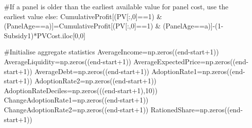 \documentclass[
  letterpaper,
  DIV=11,
  numbers=noendperiod]{scrartcl}
\newenvironment{Shaded}{\begin{snugshade}}{\end{snugshade}}
\newcommand{\CommentTok}[1]{\textcolor[rgb]{0.37,0.37,0.37}{#1}}
\newcommand{\ControlFlowTok}[1]{\textcolor[rgb]{0.00,0.23,0.31}{#1}}
\newcommand{\DecValTok}[1]{\textcolor[rgb]{0.68,0.00,0.00}{#1}}
\newcommand{\NormalTok}[1]{\textcolor[rgb]{0.00,0.23,0.31}{#1}}
\newcommand{\OperatorTok}[1]{\textcolor[rgb]{0.37,0.37,0.37}{#1}}
\begin{document}
\begin{Shaded}
\begin{Highlighting}[]
        \CommentTok{\#If a panel is older than the earliest available value for panel cost, use the earliest value}
        \ControlFlowTok{else}\NormalTok{:}
\NormalTok{            CumulativeProfit[(PV[:,}\DecValTok{0}\NormalTok{]}\OperatorTok{==}\DecValTok{1}\NormalTok{) }\OperatorTok{\&}\NormalTok{ (PanelAge}\OperatorTok{==}\NormalTok{a)]}\OperatorTok{=}\NormalTok{CumulativeProfit[(PV[:,}\DecValTok{0}\NormalTok{]}\OperatorTok{==}\DecValTok{1}\NormalTok{) }\OperatorTok{\&}\NormalTok{ (PanelAge}\OperatorTok{==}\NormalTok{a)]}\OperatorTok{{-}}\NormalTok{(}\DecValTok{1}\OperatorTok{{-}}\NormalTok{Subsidy1)}\OperatorTok{*}\NormalTok{PVCost.iloc[}\DecValTok{0}\NormalTok{,}\DecValTok{0}\NormalTok{]}


    \CommentTok{\#Initialise aggregate statistics}
\NormalTok{    AverageIncome}\OperatorTok{=}\NormalTok{np.zeros((end}\OperatorTok{{-}}\NormalTok{start}\OperatorTok{+}\DecValTok{1}\NormalTok{))}
\NormalTok{    AverageLiquidity}\OperatorTok{=}\NormalTok{np.zeros((end}\OperatorTok{{-}}\NormalTok{start}\OperatorTok{+}\DecValTok{1}\NormalTok{))}
\NormalTok{    AverageExpectedPrice}\OperatorTok{=}\NormalTok{np.zeros((end}\OperatorTok{{-}}\NormalTok{start}\OperatorTok{+}\DecValTok{1}\NormalTok{))}
\NormalTok{    AverageDebt}\OperatorTok{=}\NormalTok{np.zeros((end}\OperatorTok{{-}}\NormalTok{start}\OperatorTok{+}\DecValTok{1}\NormalTok{))}
\NormalTok{    AdoptionRate1}\OperatorTok{=}\NormalTok{np.zeros((end}\OperatorTok{{-}}\NormalTok{start}\OperatorTok{+}\DecValTok{1}\NormalTok{))}
\NormalTok{    AdoptionRate2}\OperatorTok{=}\NormalTok{np.zeros((end}\OperatorTok{{-}}\NormalTok{start}\OperatorTok{+}\DecValTok{1}\NormalTok{))}
\NormalTok{    AdoptionRateDeciles}\OperatorTok{=}\NormalTok{np.zeros(((end}\OperatorTok{{-}}\NormalTok{start}\OperatorTok{+}\DecValTok{1}\NormalTok{),}\DecValTok{10}\NormalTok{))}
\NormalTok{    ChangeAdoptionRate1}\OperatorTok{=}\NormalTok{np.zeros((end}\OperatorTok{{-}}\NormalTok{start}\OperatorTok{+}\DecValTok{1}\NormalTok{))}
\NormalTok{    ChangeAdoptionRate2}\OperatorTok{=}\NormalTok{np.zeros((end}\OperatorTok{{-}}\NormalTok{start}\OperatorTok{+}\DecValTok{1}\NormalTok{))}
\NormalTok{    RationedShare}\OperatorTok{=}\NormalTok{np.zeros((end}\OperatorTok{{-}}\NormalTok{start}\OperatorTok{+}\DecValTok{1}\NormalTok{))}


\end{Highlighting}
\end{Shaded}
\end{document}
